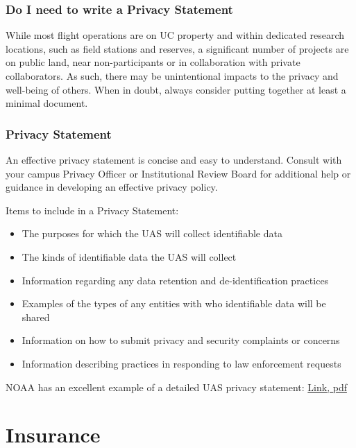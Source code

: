 \documentclass[
]{book}
\providecommand{\tightlist}{%
  \setlength{\itemsep}{0pt}\setlength{\parskip}{0pt}}
\begin{document}
\hypertarget{do-i-need-to-write-a-privacy-statement}{%
\section{Do I need to write a Privacy Statement}\label{do-i-need-to-write-a-privacy-statement}}

While most flight operations are on UC property and within dedicated research locations, such as field stations and reserves, a significant number of projects are on public land, near non-participants or in collaboration with private collaborators. As such, there may be unintentional impacts to the privacy and well-being of others. When in doubt, always consider putting together at least a minimal document.

\hypertarget{privacy-statement}{%
\section{Privacy Statement}\label{privacy-statement}}

An effective privacy statement is concise and easy to understand. Consult with your campus Privacy Officer or Institutional Review Board for additional help or guidance in developing an effective privacy policy.

Items to include in a Privacy Statement:

\begin{itemize}
\tightlist
\item
  The purposes for which the UAS will collect identifiable data
\item
  The kinds of identifiable data the UAS will collect
\item
  Information regarding any data retention and de-identification practices
\item
  Examples of the types of any entities with who identifiable data will be shared
\item
  Information on how to submit privacy and security complaints or concerns
\item
  Information describing practices in responding to law enforcement requests
\end{itemize}

NOAA has an excellent example of a detailed UAS privacy statement: \protect\hyperlink{https:ux2fux2fwww.cio.noaa.govux2fitmanagementux2fpdfsux2fSigned_UAS_PrivacyPolicy.pdf}{Link, pdf}

\hypertarget{part-insurance}{%
\part{Insurance}\label{part-insurance}}
\end{document}

